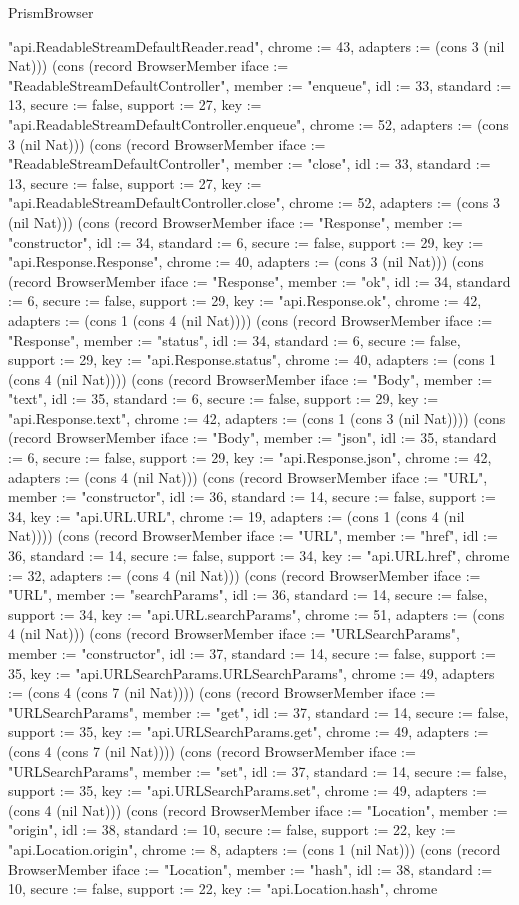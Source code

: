 \begin{lexlean}{PrismBrowser}
\begin{semanticmodule}
{"api.ReadableStreamDefaultReader.read", chrome := 43, adapters := (cons 3 (nil Nat))}) (cons (record BrowserMember {iface := "ReadableStreamDefaultController", member := "enqueue", idl := 33, standard := 13, secure := false, support := 27, key := "api.ReadableStreamDefaultController.enqueue", chrome := 52, adapters := (cons 3 (nil Nat))}) (cons (record BrowserMember {iface := "ReadableStreamDefaultController", member := "close", idl := 33, standard := 13, secure := false, support := 27, key := "api.ReadableStreamDefaultController.close", chrome := 52, adapters := (cons 3 (nil Nat))}) (cons (record BrowserMember {iface := "Response", member := "constructor", idl := 34, standard := 6, secure := false, support := 29, key := "api.Response.Response", chrome := 40, adapters := (cons 3 (nil Nat))}) (cons (record BrowserMember {iface := "Response", member := "ok", idl := 34, standard := 6, secure := false, support := 29, key := "api.Response.ok", chrome := 42, adapters := (cons 1 (cons 4 (nil Nat)))}) (cons (record BrowserMember {iface := "Response", member := "status", idl := 34, standard := 6, secure := false, support := 29, key := "api.Response.status", chrome := 40, adapters := (cons 1 (cons 4 (nil Nat)))}) (cons (record BrowserMember {iface := "Body", member := "text", idl := 35, standard := 6, secure := false, support := 29, key := "api.Response.text", chrome := 42, adapters := (cons 1 (cons 3 (nil Nat)))}) (cons (record BrowserMember {iface := "Body", member := "json", idl := 35, standard := 6, secure := false, support := 29, key := "api.Response.json", chrome := 42, adapters := (cons 4 (nil Nat))}) (cons (record BrowserMember {iface := "URL", member := "constructor", idl := 36, standard := 14, secure := false, support := 34, key := "api.URL.URL", chrome := 19, adapters := (cons 1 (cons 4 (nil Nat)))}) (cons (record BrowserMember {iface := "URL", member := "href", idl := 36, standard := 14, secure := false, support := 34, key := "api.URL.href", chrome := 32, adapters := (cons 4 (nil Nat))}) (cons (record BrowserMember {iface := "URL", member := "searchParams", idl := 36, standard := 14, secure := false, support := 34, key := "api.URL.searchParams", chrome := 51, adapters := (cons 4 (nil Nat))}) (cons (record BrowserMember {iface := "URLSearchParams", member := "constructor", idl := 37, standard := 14, secure := false, support := 35, key := "api.URLSearchParams.URLSearchParams", chrome := 49, adapters := (cons 4 (cons 7 (nil Nat)))}) (cons (record BrowserMember {iface := "URLSearchParams", member := "get", idl := 37, standard := 14, secure := false, support := 35, key := "api.URLSearchParams.get", chrome := 49, adapters := (cons 4 (cons 7 (nil Nat)))}) (cons (record BrowserMember {iface := "URLSearchParams", member := "set", idl := 37, standard := 14, secure := false, support := 35, key := "api.URLSearchParams.set", chrome := 49, adapters := (cons 4 (nil Nat))}) (cons (record BrowserMember {iface := "Location", member := "origin", idl := 38, standard := 10, secure := false, support := 22, key := "api.Location.origin", chrome := 8, adapters := (cons 1 (nil Nat))}) (cons (record BrowserMember {iface := "Location", member := "hash", idl := 38, standard := 10, secure := false, support := 22, key := "api.Location.hash", chrome }
\end{semanticmodule}
\end{lexlean}
